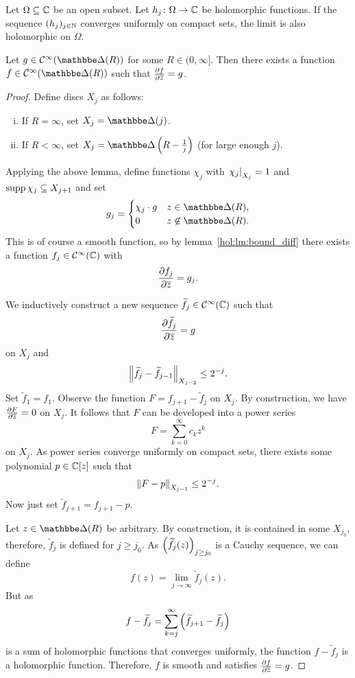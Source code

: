 \begin{lema}
Let $\Omega \subseteq \mathbb{C}$ be an open subset. Let
$h_j \colon \Omega \to \mathbb{C}$ be holomorphic functions. If the
sequence $(h_j)_{j \in \mathbb{N}}$ converges uniformly on compact sets,
the limit is also holomorphic on $\Omega$.
\end{lema}

\begin{izrek}
Let $g \in \mathcal{C}^\infty(\dsk(R))$ for some
$R \in (0, \infty]$. Then there exists a function
$f \in \mathcal{C}^\infty(\dsk(R))$ such that
$\frac{\partial f}{\partial \overline{z}} = g$.
\end{izrek}

\begin{proof}
Define discs $X_j$ as follows:

\begin{enumerate}[i)]
\item If $R = \infty$, set $X_j = \dsk(j)$.
\item If $R < \infty$, set $X_j = \dsk \br{R - \frac{1}{j}}$ (for
large enough $j$).
\end{enumerate}

Applying the above lemma, define functions $\chi_j$ with
$\left. \chi_j\right|_{X_j}^{} = 1$ and $\operatorname{supp} \chi_j \subseteq X_{j+1}$ and
set
\[
g_j =
\begin{cases}
\chi_j \cdot g & z \in \dsk(R), \\
       0       & z \not \in \dsk(R).
\end{cases}
\]
This is of course a smooth function, so by
lemma~\ref{hol:lm:bound_diff} there exists a function
$f_j \in \mathcal{C}^\infty(\mathbb{C})$ with
\[
\frac{\partial f_j}{\partial \overline{z}} = g_j.
\]

We inductively construct a new sequence
$\widetilde{f}_j \in \mathcal{C}^\infty(\mathbb{C})$ such that
\[
\frac{\partial \widetilde{f}_j}{\partial \overline{z}} = g
\]
on $X_j$ and
\[
\left\lVert \widetilde{f}_j - \widetilde{f}_{j-1}\right\rVert_{X_{j-2}} \leq 2^{-j}.
\]
Set $\widetilde{f}_1 = f_1$. Observe the function
$F = f_{j+1} - \widetilde{f}_j$ on $X_j$. By construction, we have
$\frac{\partial F}{\partial \overline{z}} = 0$ on $X_j$. It follows that $F$ can be
developed into a power series
\[
F = \sum_{k=0}^\infty c_k z^k
\]
on $X_j$. As power series converge uniformly on compact sets, there
exists some polynomial $p \in \mathbb{C}[z]$ such that
\[
\left\lVert F - p\right\rVert_{X_{j-1}} \leq 2^{-j}.
\]
Now just set $\widetilde{f}_{j+1} = f_{j+1} - p$.

Let $z \in \dsk(R)$ be arbitrary. By construction, it is contained
in some $X_{j_0}$, therefore, $\widetilde{f}_j$ is defined for
$j \geq j_0$. As $\left(\widetilde{f}_j(z)\right)_{j \geq j_0}$ is a
Cauchy sequence, we can define
\[
f(z) = \lim_{j \to \infty} \widetilde{f}_j(z).
\]
But as
\[
f - \widetilde{f}_j =
\sum_{k=j}^\infty \left(\widetilde{f}_{j+1} - \widetilde{f}_j\right)
\]
is a sum of holomorphic functions that converges uniformly, the
function $f - \widetilde{f}_j$ is a holomorphic function.
Therefore, $f$ is smooth and satisfies $\frac{\partial f}{\partial \overline{z}} = g$.
\end{proof}

